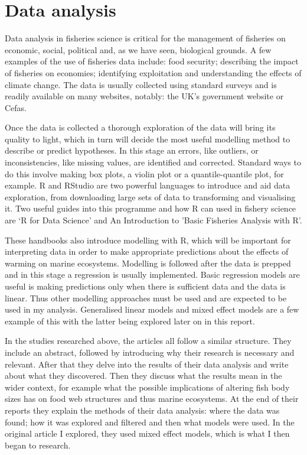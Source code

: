 \documentclass{article}
\begin{document}
\section{Data analysis}

Data analysis in fisheries science is critical for the management of fisheries on economic, social, political and, as we have seen, biological grounds. A few examples of the use of fisheries data include: food security; describing the impact of fisheries on economies; identifying exploitation and understanding the effects of climate change. The data is usually collected using standard surveys and is readily available on many websites, notably: the UK's government website or Cefas.

Once the data is collected a thorough exploration of the data will bring its quality to light, which in turn will decide the most useful modelling method to describe or predict hypotheses. In this stage an errors, like outliers, or inconsistencies, like missing values, are identified and corrected. Standard ways to do this involve making box plots, a violin plot or a quantile-quantile plot, for example. R and RStudio are two powerful languages to introduce and aid data exploration, from downloading large sets of data to transforming and visualising it. Two useful guides into this programme and how R can used in fishery science are ‘R for Data Science’ and An Introduction to 'Basic Fisheries Analysis with R’. 

These handbooks also introduce modelling with R, which will be important for interpreting data in order to make appropriate predictions about the effects of warming on marine ecosystems. Modelling is followed after the data is prepped and in this stage a regression is usually implemented. Basic regression models are useful is making predictions only when there is sufficient data and the data is linear. Thus other modelling approaches must be used and are expected to be used in my analysis. Generalised linear models and mixed effect models are a few example of this with the latter being explored later on in this report.

In the studies researched above, the articles all follow a similar structure. They include an abstract, followed by introducing why their research is necessary and relevant. After that they delve into the results of their data analysis and write about what they discovered. Then they discuss what the results mean in the wider context, for example what the possible implications of altering fish body sizes has on food web structures and thus marine ecosystems. At the end of their reports they explain the methods of their data analysis: where the data was found; how it was explored and filtered and then what models were used. In the original article I explored, they used mixed effect models, which is what I then began to research. 
\end{document}
